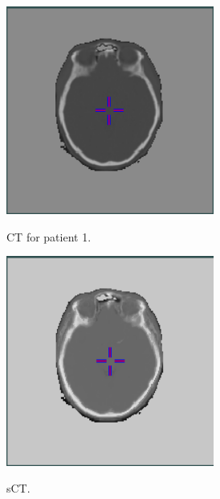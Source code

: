 \begin{figure}
    \centering
    \begin{subfigure}[b]{0.3\textwidth}
        \caption{CT for patient 1.}
        \includegraphics[width=0.75\textwidth]{colager/loocv_ct/loocv_010476_ct.png}
        \label{col:loocv_ct_pat1_ct}
    \end{subfigure}\hfill
    \begin{subfigure}[b]{0.3\textwidth}
        \caption{sCT.}
        \includegraphics[width=0.75\textwidth]{colager/loocv_ct/loocv_010476_sct.png}
        \label{col:loocv_ct_pat1_sct}
    \end{subfigure}\hfill
    \begin{subfigure}[b]{0.3\textwidth}

\end{subfigure}
\end{figure}
